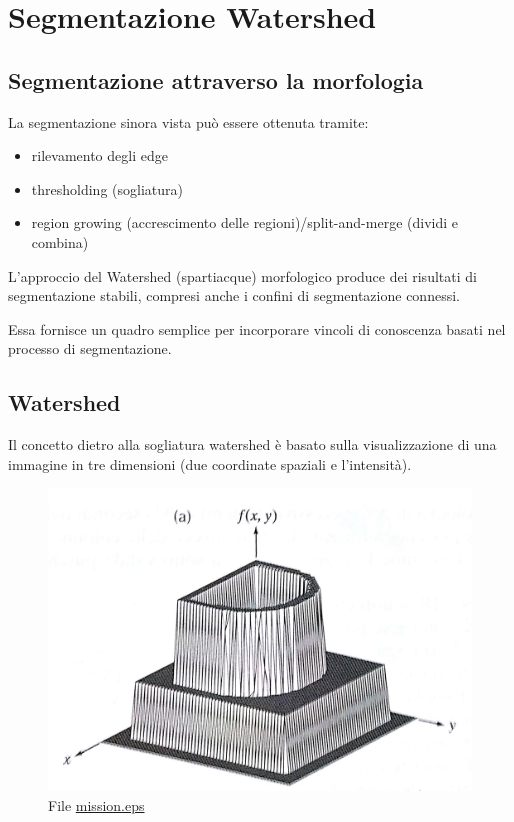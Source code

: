 \chapter{Segmentazione Watershed}

\section{Segmentazione attraverso la morfologia}
La segmentazione sinora vista può essere ottenuta tramite:
\begin{itemize}
	\item rilevamento degli edge
	\item thresholding (sogliatura)
	\item region growing (accrescimento delle regioni)/split-and-merge (dividi e combina)
\end{itemize}

L'approccio del Watershed (spartiacque) morfologico produce dei risultati di segmentazione stabili, compresi anche i confini di segmentazione connessi.

Essa fornisce un quadro semplice per incorporare vincoli di conoscenza basati nel processo di segmentazione.

\section{Watershed}
Il concetto dietro alla sogliatura watershed è basato sulla visualizzazione di una immagine in tre dimensioni (due coordinate spaziali e l'intensità).

\begin{figure}[htbp]
	\centering
	\includegraphics[scale=.15]{img/1050.png}
	\caption{File \protect\url{mission.eps}\label{fig:mission}}
\end{figure}

